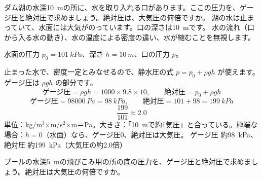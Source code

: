 \begin{phreidai}[ダム湖の取水口の圧力]
\label{ph:力-12:ex2}ダム湖の水深\qty{10}{m}の所に、水を取り入れる口があります。ここの圧力を、ゲージ圧と絶対圧で求めましょう。絶対圧は、大気圧の何倍ですか。
\phbamen
湖の水は止まっていて、水面には大気がのっています。口の深さは\qty{10}{m}です。
\phmushi
水の流れ（口から入る水の動き）、水の温度による密度の違い、水が縮むことを無視します。
\phzu
\noindent\begin{minipage}[c]{0.34\linewidth}\centering
{}
\end{minipage}\hfill
\begin{minipage}[c]{0.63\linewidth}\raggedright
水面の圧力 $p_0=\qty{101}{kPa}$、深さ $h=\qty{10}{m}$、口の圧力 $p$。
\end{minipage}
\phriyu
止まった水で、密度一定とみなせるので、静水圧の式 $p=p_0+\rho gh$ が使えます。ゲージ圧は $\rho gh$ の部分です。
\phtateru
\[ \text{ゲージ圧}=\rho gh=1000\times9.8\times10,\qquad \text{絶対圧}=p_0+\rho gh \]
\phtoku
\[ \text{ゲージ圧}=\qty{98000}{Pa}=\qty{98}{kPa},\qquad \text{絶対圧}=101+98=\qty{199}{kPa} \]
\[ \frac{199}{101}\approx2.0 \]
\phtashikame
単位：kg/m$^3$×m/s$^2$×m＝Pa。大きさ：「\qty{10}{m}で約1気圧」と合っている。極端な場合：$h=0$（水面）なら、ゲージ圧0、絶対圧は大気圧。
\kotae ゲージ圧 約\qty{98}{kPa}、絶対圧 約\qty{199}{kPa}（大気圧の約2.0倍）
\end{phreidai}
\begin{jibun}
プールの水深\qty{5}{m}の飛びこみ用の所の底の圧力を、ゲージ圧と絶対圧で求めましょう。絶対圧は大気圧の何倍ですか。
\end{jibun}

